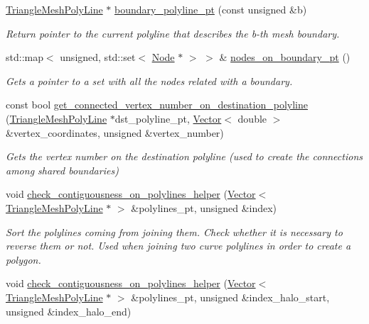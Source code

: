 \begin{DoxyCompactItemize}
\hyperlink{classoomph_1_1TriangleMeshPolyLine}{Triangle\+Mesh\+Poly\+Line} $\ast$ \hyperlink{classoomph_1_1UnstructuredTwoDMeshGeometryBase_a9b65df01b68d6b5c81662c39a8523db4}{boundary\+\_\+polyline\+\_\+pt} (const unsigned \&b)
\begin{DoxyCompactList}\small\item\em Return pointer to the current polyline that describes the b-\/th mesh boundary. \end{DoxyCompactList}\item 
std\+::map$<$ unsigned, std\+::set$<$ \hyperlink{classoomph_1_1Node}{Node} $\ast$ $>$ $>$ \& \hyperlink{classoomph_1_1UnstructuredTwoDMeshGeometryBase_a12e63d83e38ef8f7cb31d9fe09f0de71}{nodes\+\_\+on\+\_\+boundary\+\_\+pt} ()
\begin{DoxyCompactList}\small\item\em Gets a pointer to a set with all the nodes related with a boundary. \end{DoxyCompactList}\item 
const bool \hyperlink{classoomph_1_1UnstructuredTwoDMeshGeometryBase_a250f79da0b57d5567dbacf91ba93f29c}{get\+\_\+connected\+\_\+vertex\+\_\+number\+\_\+on\+\_\+destination\+\_\+polyline} (\hyperlink{classoomph_1_1TriangleMeshPolyLine}{Triangle\+Mesh\+Poly\+Line} $\ast$dst\+\_\+polyline\+\_\+pt, \hyperlink{classoomph_1_1Vector}{Vector}$<$ double $>$ \&vertex\+\_\+coordinates, unsigned \&vertex\+\_\+number)
\begin{DoxyCompactList}\small\item\em Gets the vertex number on the destination polyline (used to create the connections among shared boundaries) \end{DoxyCompactList}\item 
void \hyperlink{classoomph_1_1UnstructuredTwoDMeshGeometryBase_a0d709e87f038a60e3c8f8b84af412fa4}{check\+\_\+contiguousness\+\_\+on\+\_\+polylines\+\_\+helper} (\hyperlink{classoomph_1_1Vector}{Vector}$<$ \hyperlink{classoomph_1_1TriangleMeshPolyLine}{Triangle\+Mesh\+Poly\+Line} $\ast$ $>$ \&polylines\+\_\+pt, unsigned \&index)
\begin{DoxyCompactList}\small\item\em Sort the polylines coming from joining them. Check whether it is necessary to reverse them or not. Used when joining two curve polylines in order to create a polygon. \end{DoxyCompactList}\item 
void \hyperlink{classoomph_1_1UnstructuredTwoDMeshGeometryBase_a3c9454772f4b9fd99aba7e99e2b15d6b}{check\+\_\+contiguousness\+\_\+on\+\_\+polylines\+\_\+helper} (\hyperlink{classoomph_1_1Vector}{Vector}$<$ \hyperlink{classoomph_1_1TriangleMeshPolyLine}{Triangle\+Mesh\+Poly\+Line} $\ast$ $>$ \&polylines\+\_\+pt, unsigned \&index\+\_\+halo\+\_\+start, unsigned \&index\+\_\+halo\+\_\+end)

\end{DoxyCompactItemize}
